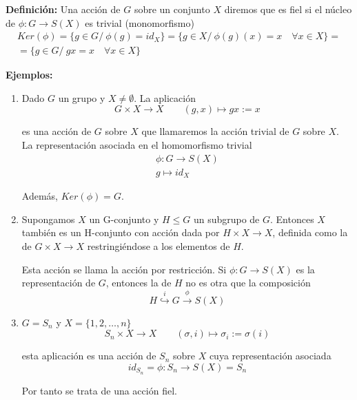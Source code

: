 \documentclass{article}
\begin{document}
\textbf{Definición:} Una acción de $G$ sobre un conjunto $X$ diremos que es fiel si el núcleo de $\phi:G\longrightarrow S(X)$ es trivial (monomorfismo)
\begin{gather*}
Ker(\phi)=\{g\in G/\:\phi(g)=id_X\}=\{g\in X/\:\phi(g)(x)=x\quad \forall x\in X\}= \\
=\{g\in G/\:gx=x\quad \forall x\in X\}
\end{gather*}

\textbf{Ejemplos:} \begin{enumerate}[1)]
\item Dado $G$ un grupo y $X\neq \emptyset$. La aplicación
\begin{equation*}
G\times X\longrightarrow X\qquad (g,x)\longmapsto gx:=x
\end{equation*}

es una acción de $G$ sobre $X$ que llamaremos la acción trivial de $G$ sobre $X$. La representación asociada en el homomorfismo trivial
\begin{gather*}
\phi:G\longrightarrow S(X) \\
g\longmapsto id_X
\end{gather*}

Además, $Ker(\phi)=G$.

\item Supongamos $X$ un G-conjunto y $H\leq G$ un subgrupo de $G$. Entonces $X$ también es un H-conjunto con acción dada por $H\times X\longrightarrow X$, definida como la de $G\times X\longrightarrow X$ restringiéndose a los elementos de $H$.

Esta acción se llama la acción por restricción. Si $\phi:G\longrightarrow S(X)$ es la representación de $G$, entonces la de $H$ no es otra que la composición
\begin{equation*}
H\overset{i}{\hookrightarrow} G \overset{\phi}{\rightarrow} S(X)
\end{equation*}

\item $G=S_n$ y $X=\{1,2,\ldots,n\}$
\begin{equation*}
S_n\times X\longrightarrow X \qquad (\sigma,i)\longmapsto \sigma_i:=\sigma(i)
\end{equation*}

esta aplicación es una acción de $S_n$ sobre $X$ cuya representación asociada
\begin{equation*}
id_{S_n}=\phi:S_n\longrightarrow S(X)=S_n
\end{equation*}

Por tanto se trata de una acción fiel.


\end{enumerate}
\end{document}

